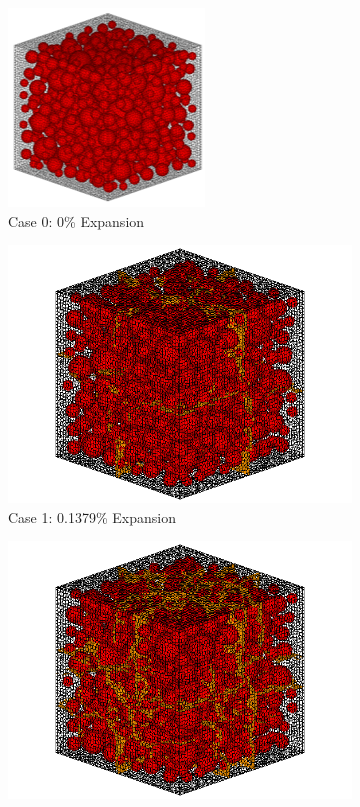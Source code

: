 \begin{figure}[!h]
\centering

    \begin{subfigure}{.5\textwidth}
      \centering
      \includegraphics[width=.6\linewidth]{Files/Aggregate/A30.png}
    \caption{Case 0: 0\% Expansion}
    \end{subfigure}%
    \begin{subfigure}{.5\textwidth}
      \centering
      \includegraphics[width=.8\linewidth]{Files/exp_3D/DEF/A30X0C_1_c.png}
    \caption{Case 1: 0.1379\% Expansion}
    \end{subfigure}
    \begin{subfigure}{.5\textwidth}
      \centering
      \includegraphics[width=.8\linewidth]{Files/exp_3D/DEF/A30X0C_2_c.png}

\end{subfigure}
\end{figure}
